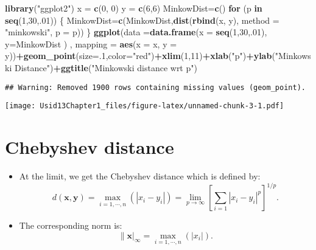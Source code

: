 \documentclass[
]{article}
\newenvironment{Shaded}{\begin{snugshade}}{\end{snugshade}}
\newcommand{\ControlFlowTok}[1]{\textcolor[rgb]{0.13,0.29,0.53}{\textbf{#1}}}
\newcommand{\DataTypeTok}[1]{\textcolor[rgb]{0.13,0.29,0.53}{#1}}
\newcommand{\DecValTok}[1]{\textcolor[rgb]{0.00,0.00,0.81}{#1}}
\newcommand{\KeywordTok}[1]{\textcolor[rgb]{0.13,0.29,0.53}{\textbf{#1}}}
\newcommand{\NormalTok}[1]{#1}
\newcommand{\OperatorTok}[1]{\textcolor[rgb]{0.81,0.36,0.00}{\textbf{#1}}}
\newcommand{\StringTok}[1]{\textcolor[rgb]{0.31,0.60,0.02}{#1}}
\providecommand{\tightlist}{%
  \setlength{\itemsep}{0pt}\setlength{\parskip}{0pt}}
\begin{document}
\begin{Shaded}
\begin{Highlighting}[]
\KeywordTok{library}\NormalTok{(}\StringTok{"ggplot2"}\NormalTok{)}
\NormalTok{x =}\StringTok{ }\KeywordTok{c}\NormalTok{(}\DecValTok{0}\NormalTok{, }\DecValTok{0}\NormalTok{)}
\NormalTok{y =}\StringTok{ }\KeywordTok{c}\NormalTok{(}\DecValTok{6}\NormalTok{,}\DecValTok{6}\NormalTok{)}
\NormalTok{MinkowDist=}\KeywordTok{c}\NormalTok{()}
\ControlFlowTok{for}\NormalTok{ (p }\ControlFlowTok{in} \KeywordTok{seq}\NormalTok{(}\DecValTok{1}\NormalTok{,}\DecValTok{30}\NormalTok{,.}\DecValTok{01}\NormalTok{))}
\NormalTok{\{}
\NormalTok{MinkowDist=}\KeywordTok{c}\NormalTok{(MinkowDist,}\KeywordTok{dist}\NormalTok{(}\KeywordTok{rbind}\NormalTok{(x, y), }\DataTypeTok{method =} \StringTok{"minkowski"}\NormalTok{, }\DataTypeTok{p =}\NormalTok{ p))     }
\NormalTok{\}}
\KeywordTok{ggplot}\NormalTok{(}\DataTypeTok{data =}\KeywordTok{data.frame}\NormalTok{(}\DataTypeTok{x =} \KeywordTok{seq}\NormalTok{(}\DecValTok{1}\NormalTok{,}\DecValTok{30}\NormalTok{,.}\DecValTok{01}\NormalTok{), }\DataTypeTok{y=}\NormalTok{MinkowDist ) , }\DataTypeTok{mapping =} \KeywordTok{aes}\NormalTok{(}\DataTypeTok{x =}\NormalTok{ x, }\DataTypeTok{y =}\NormalTok{ y))}\OperatorTok{+}\KeywordTok{geom_point}\NormalTok{(}\DataTypeTok{size=}\NormalTok{.}\DecValTok{1}\NormalTok{,}\DataTypeTok{color=}\StringTok{"red"}\NormalTok{)}\OperatorTok{+}\KeywordTok{xlim}\NormalTok{(}\DecValTok{1}\NormalTok{,}\DecValTok{11}\NormalTok{)}\OperatorTok{+}\KeywordTok{xlab}\NormalTok{(}\StringTok{"p"}\NormalTok{)}\OperatorTok{+}\KeywordTok{ylab}\NormalTok{(}\StringTok{"Minkowski Distance"}\NormalTok{)}\OperatorTok{+}\KeywordTok{ggtitle}\NormalTok{(}\StringTok{"Minkowski distance wrt p"}\NormalTok{)}
\end{Highlighting}
\end{Shaded}

\begin{verbatim}
## Warning: Removed 1900 rows containing missing values (geom_point).
\end{verbatim}

\texttt{[image: Usid13Chapter1\_files/figure-latex/unnamed-chunk-3-1.pdf]}

\hypertarget{chebyshev-distance}{%
\section{Chebyshev distance}\label{chebyshev-distance}}

\begin{itemize}
\tightlist
\item
  At the limit, we get the Chebyshev distance which is defined by: \[
  d(\mathbf{x},\mathbf{y})=\max_{i=1,\cdots,n}(|x_i-y_i|)=\lim_{p\rightarrow\infty}
  \left[\sum_{i=1} |x_i-y_i|^{p}\right]^{1/p}.
  \]
\item
  The corresponding norm is: \[
  \|\mathbf{x}|_\infty=\max_{i=1,\cdots,n}(|x_i|).
  \]
\end{itemize}
\end{document}

